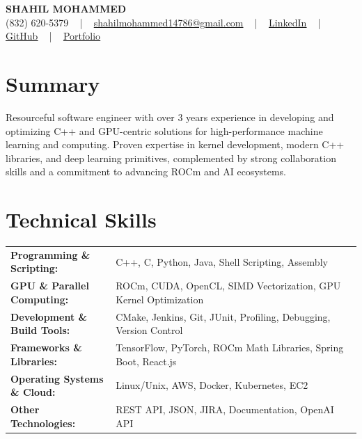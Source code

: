\documentclass[letterpaper,11pt]{article}
\begin{document}
\begin{center}
    {\fontsize{14pt}{12pt}\selectfont \textbf{\MakeUppercase{Shahil Mohammed}}}\\ \vspace{2pt}
    \fontsize{10pt}{12pt}\selectfont (832) 620-5379 ~ | ~ \href{mailto:shahilmohammed14786@gmail.com}{shahilmohammed14786@gmail.com} ~ | ~  
    \href{https://www.linkedin.com/in/shahil-mohammed-9652931a1/}{\color{blue}\underline{LinkedIn}}  ~ | ~ 
    \href{https://github.com/freakbeast14}{\color{blue}\underline{GitHub}} ~ | ~ 
    \href{https://shahil-mohammed.netlify.app/}{\color{blue}\underline{Portfolio}}
    \vspace{-8pt}
\end{center}

\section{Summary}
\fontsize{9pt}{10pt}\selectfont
Resourceful software engineer with over 3 years experience in developing and optimizing C++ and GPU-centric solutions for high-performance machine learning and computing. Proven expertise in kernel development, modern C++ libraries, and deep learning primitives, complemented by strong collaboration skills and a commitment to advancing ROCm and AI ecosystems.
 \vspace{-5pt}
 
\section{Technical Skills}
        \vspace{-14pt}
        \begin{table}[h]
            \fontsize{9pt}{10pt}\selectfont
            \begin{tabular}{p{0.3\linewidth} p{0.7\linewidth}}
                \textbf{Programming \& Scripting:} & C++, C, Python, Java, Shell Scripting, Assembly \\
                \textbf{GPU \& Parallel Computing:} & ROCm, CUDA, OpenCL, SIMD Vectorization, GPU Kernel Optimization \\
                \textbf{Development \& Build Tools:} & CMake, Jenkins, Git, JUnit, Profiling, Debugging, Version Control \\
                \textbf{Frameworks \& Libraries:} & TensorFlow, PyTorch, ROCm Math Libraries, Spring Boot, React.js \\
                \textbf{Operating Systems \& Cloud:} & Linux/Unix, AWS, Docker, Kubernetes, EC2 \\
                \textbf{Other Technologies:} & REST API, JSON, JIRA, Documentation, OpenAI API \\
            \end{tabular}
        \end{table}
 \vspace{-15pt}
 
\end{document}
